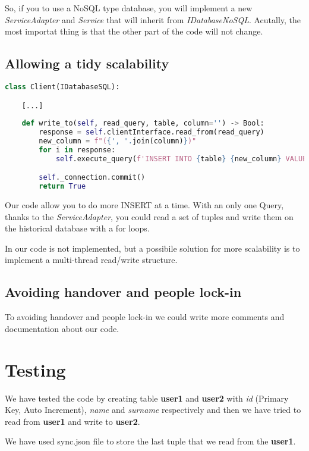 So, if you to use a NoSQL type database, you will implement a new \textit{ServiceAdapter} and \textit{Service} that will inherit from \textit{IDatabaseNoSQL}. Acutally, the most importat thing is that the other part of the code will not change.

\subsection{Allowing a tidy scalability}

\begin{lstlisting}[language=Python]
class Client(IDatabaseSQL): 

	[...]
	
	def write_to(self, read_query, table, column='') -> Bool:
		response = self.clientInterface.read_from(read_query) 
		new_column = f"({', '.join(column)})"
		for i in response:
			self.execute_query(f'INSERT INTO {table} {new_column} VALUES {(i)};') 

		self._connection.commit()
		return True
\end{lstlisting}

Our code allow you to do more INSERT at a time. With an only one Query, thanks to the \textit{ServiceAdapter}, you could read a set of tuples and write them on the historical database with a for loops.

In our code is not implemented, but a possibile solution for more scalability is to implement a multi-thread read/write structure.

\subsection{Avoiding handover and people lock-in}

To avoiding handover and people lock-in we could write more comments and documentation about our code.

\section{Testing}

We have tested the code by creating table \textbf{user1} and \textbf{user2} with \textit{id} (Primary Key, Auto Increment), \textit{name} and \textit{surname} respectively and then we have tried to read from \textbf{user1} and write to \textbf{user2}.

We have used sync.json file to store the last tuple that we read from the \textbf{user1}.

